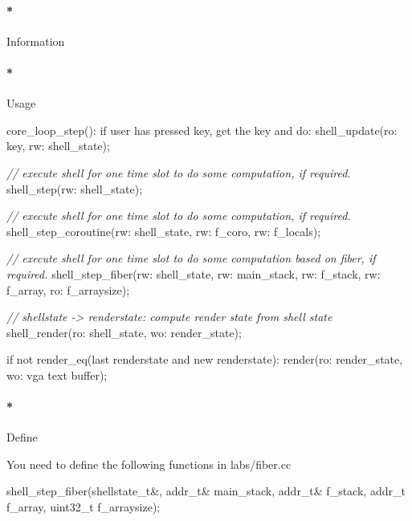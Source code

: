 \documentclass[]{article}
\newenvironment{Shaded}{}{}
\newcommand{\DataTypeTok}[1]{\textcolor[rgb]{0.50,0.00,0.00}{{#1}}}
\newcommand{\CommentTok}[1]{\textcolor[rgb]{0.50,0.50,0.50}{\textit{{#1}}}}
\newcommand{\ControlFlowTok}[1]{{#1}}
\newcommand{\NormalTok}[1]{{#1}}
\let\oldparagraph\paragraph
\renewcommand{\paragraph}[1]{\oldparagraph{#1}\mbox{}}
\begin{document}
\paragraph*{Information}\label{information-5}

\paragraph*{Usage}\label{usage-5}

\begin{Shaded}
\begin{Highlighting}[]
        \NormalTok{core_loop_step():}
            \ControlFlowTok{if} \NormalTok{user has pressed key, get the key and }\ControlFlowTok{do}\NormalTok{:}
                \NormalTok{shell_update(ro: key, rw: shell_state);}

            \CommentTok{// execute shell for one time slot to do some computation, if required.}
            \NormalTok{shell_step(rw: shell_state);}

            \CommentTok{// execute shell for one time slot to do some computation, if required.}
            \NormalTok{shell_step_coroutine(rw: shell_state, rw: f_coro, rw: f_locals);}

            \CommentTok{// execute shell for one time slot to do some computation based on fiber, if required.}
            \NormalTok{shell_step_fiber(rw: shell_state, rw: main_stack, rw: f_stack, rw: f_array, ro: f_arraysize);}

            \CommentTok{// shellstate -> renderstate: compute render state from shell state}
            \NormalTok{shell_render(ro: shell_state, wo: render_state);}

            \ControlFlowTok{if} \NormalTok{not render_eq(last renderstate and new renderstate):}
                \NormalTok{render(ro: render_state, wo: vga text buffer);}
\end{Highlighting}
\end{Shaded}

\paragraph*{Define}\label{define-5}

You need to define the following functions in labs/fiber.cc

\begin{Shaded}
\begin{Highlighting}[]
   \NormalTok{shell_step_fiber(shellstate_t&, addr_t& main_stack, addr_t& f_stack, addr_t f_array, }\DataTypeTok{uint32_t} \NormalTok{f_arraysize);}
\end{Highlighting}
\end{Shaded}
\end{document}
